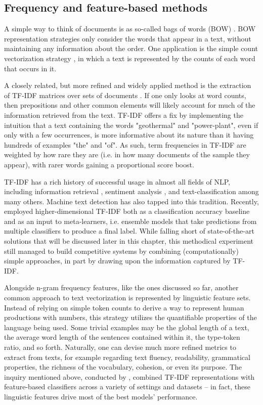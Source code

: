 \subsection{Frequency and feature-based methods}

A simple way to think of documents is as so-called bags of words (BOW) \citep{murphy2006naive}.
BOW representation strategies only consider the words that appear in a text, without maintaining any information about the order.
One application is the simple count vectorization strategy \citep{wendland2021introduction}, in which a text is represented by the counts of each word that occurs in it.

A closely related, but more refined and widely applied method is the extraction of TF-IDF matrices over sets of documents \citep{ramos2003using}.
If one only looks at word counts, then prepositions and other common elements will likely account for much of the information retrieved from the text.
TF-IDF offers a fix by implementing the intuition that a text containing the words "geothermal" and "power-plant", even if only with a few occurrences, is more informative about its nature than it having hundreds of examples "the" and "of".
As such, term frequencies in TF-IDF are weighted by how rare they are (i.e. in how many documents of the sample they appear), with rarer words gaining a proportional score boost.

TF-IDF has a rich history of successful usage in almost all fields of NLP, including information retrieval \citep{ramos2003using}, sentiment analysis \citep{cahyani2021performance}, and text-classification \citep{zhang2011comparative} among many others.
Machine text detection has also tapped into this tradition.
Recently, \citet{frohling2021feature} employed higher-dimensional TF-IDF both as a classification accuracy baseline and as an input to meta-learners, i.e. ensemble models that take predictions from multiple classifiers to produce a final label.
While falling short of state-of-the-art solutions that will be discussed later in this chapter, this methodical experiment still managed to build competitive systems by combining (computationally) simple approaches, in part by drawing upon the information captured by TF-IDF.

Alongside n-gram frequency features, like the ones discussed so far, another common approach to text vectorization is represented by linguistic feature sets.
Instead of relying on simple token counts to derive a way to represent human productions with numbers, this strategy utilizes the quantifiable properties of the language being used.
Some trivial examples may be the global length of a text, the average word length of the sentences contained within it, the type-token ratio, and so forth.
Naturally, one can devise much more refined metrics to extract from texts, for example regarding text fluency, readability, grammatical properties, the richness of the vocabulary, cohesion, or even its purpose.
The inquiry mentioned above, conducted by \citet{frohling2021feature}, combined TF-IDF representations with feature-based classifiers across a variety of settings and datasets -- in fact, these linguistic features drive most of the best models' performance.

